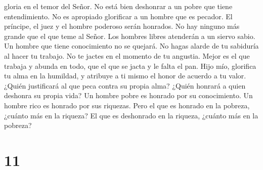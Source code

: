 gloria en el temor del Señor.  No está bien deshonrar a
un pobre que tiene entendimiento. No es apropiado glorificar a un hombre
que es pecador.  El príncipe, el juez y el hombre
poderoso serán honrados. No hay ninguno más grande que el que teme al
Señor.  Los hombres libres atenderán a un siervo sabio.
Un hombre que tiene conocimiento no se quejará.  No hagas
alarde de tu sabiduría al hacer tu trabajo. No te jactes en el momento
de tu angustia.  Mejor es el que trabaja y abunda en
todo, que el que se jacta y le falta el pan.  Hijo mío,
glorifica tu alma en la humildad, y atribuye a ti mismo el honor de
acuerdo a tu valor.  ¿Quién justificará al que peca
contra su propia alma? ¿Quién honrará a quien deshonra su propia vida?
 Un hombre pobre es honrado por su conocimiento. Un
hombre rico es honrado por sus riquezas.  Pero el que es
honrado en la pobreza, ¿cuánto más en la riqueza? El que es deshonrado
en la riqueza, ¿cuánto más en la pobreza?

\hypertarget{section-10}{%
\section{11}\label{section-10}}


